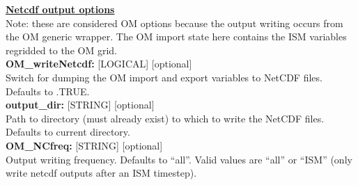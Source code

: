 \documentclass[12pt]{article}
\begin{document}
\begin{flushleft}
\textbf{\underline{Netcdf output options}}                                 \\
Note: these are considered OM options because the output writing occurs 
from the OM generic wrapper.  The OM import state here contains the 
ISM variables regridded to the OM grid.                                    \\
\textbf{OM\_writeNetcdf:}   [LOGICAL] [optional]                           \\
Switch for dumping the OM import and export variables to NetCDF files.
Defaults to .TRUE.                                                         \\
\vspace{6pt}
\textbf{output\_dir:}  [STRING] [optional]                                 \\
Path to directory (must already exist) to which to write the NetCDF files. 
Defaults to current directory.                                             \\
\vspace{6pt}
\textbf{OM\_NCfreq:}  [STRING] [optional]                                 \\
Output writing frequency.
Defaults to ``all''.  Valid values are ``all'' or ``ISM'' (only write 
netcdf outputs after an ISM timestep).
\vspace{22pt}


\end{flushleft}
\end{document}
